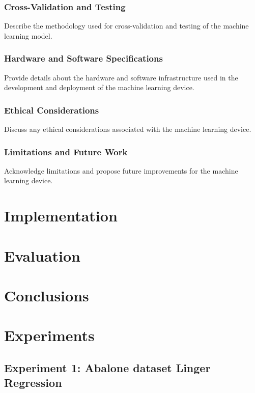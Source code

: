 \documentclass[a4paper, 12pt]{report}
\begin{document}
\subsection{Cross-Validation and Testing}
Describe the methodology used for cross-validation and testing of the machine learning model.

\subsection{Hardware and Software Specifications}
Provide details about the hardware and software infrastructure used in the development and deployment of the machine learning device.

\subsection{Ethical Considerations}
Discuss any ethical considerations associated with the machine learning device.

\subsection{Limitations and Future Work}
Acknowledge limitations and propose future improvements for the machine learning device.


\chapter{Implementation}
\label{ch:Implementation}

\chapter{Evaluation}
\label{ch:Evaluation}

\chapter{Conclusions}
\label{ch:Conclusions}

\chapter{Experiments}
\label{ch:Experimnents}

\section{Experiment 1: Abalone dataset Linger Regression}
\end{document}
